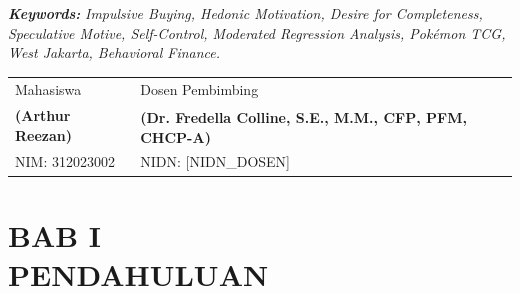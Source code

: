 \documentclass[12pt,a4paper]{article}
\numberwithin{equation}{section}
\numberwithin{table}{section}
\numberwithin{figure}{section}
\newcommand{\namamahasiswa}{Arthur Reezan}
\newcommand{\nim}{312023002}
\newcommand{\dosbim}{Dr. Fredella Colline, S.E., M.M., CFP\textsuperscript{\textregistered}, PFM, CHCP-A}
\newcommand{\nidn}{[NIDN\_DOSEN]}
\begin{document}
\begin{singlespace}
\vspace{0.15cm}
\noindent\textbf{\emph{Keywords:}} \emph{Impulsive Buying, Hedonic Motivation, Desire for Completeness, Speculative Motive, Self-Control, Moderated Regression Analysis, Pok\'emon TCG, West Jakarta, Behavioral Finance.}

\vspace{0.25cm}
\noindent
\begin{tabular}{@{}p{6.6cm} p{6.6cm}@{}}
  Mahasiswa & Dosen Pembimbing \\[0.9cm]
  \textbf{(\namamahasiswa)} & \textbf{(\dosbim)} \\
  NIM: \nim & NIDN: \nidn
\end{tabular}
\end{singlespace}

\newpage
\thispagestyle{frontmatter}
\renewcommand{\contentsname}{DAFTAR ISI}
\tableofcontents
{}

\newpage
\thispagestyle{frontmatter}
\renewcommand{\listtablename}{DAFTAR TABEL}
\listoftables
{}
{}

\newpage
\thispagestyle{frontmatter}
\renewcommand{\listfigurename}{DAFTAR GAMBAR}
\listoffigures
{}
{}

\newpage
{}
\pagestyle{fancy}

\setcounter{section}{0}
\section*{BAB I\\[0.3cm]PENDAHULUAN}
{}
\setcounter{section}{1}
\setcounter{subsection}{0}
\setcounter{table}{0}
\setcounter{figure}{0}
\setcounter{equation}{0}
\end{document}
